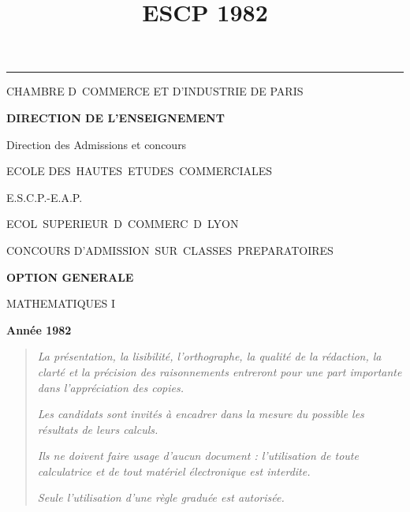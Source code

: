 \documentclass[11pt]{article}%
\title{\bf \vspace{-2cm} ESCP 1982} %
\author{} %
\date{} %
\begin{document}
\maketitle %
\vspace{-1.4cm}\hrule %
\thispagestyle{fancy}

\vspace*{.2cm}




\begin{center}
{\small CHAMBRE D\E\ COMMERCE ET D'INDUSTRIE DE PARIS}

\textbf{DIRECTION DE L'ENSEIGNEMENT}

Direction des Admissions et concours

\underline{\hspace*{3cm}}

{\Large ECOLE DES\ HAUTES\ ETUDES\ COMMERCIALES}

{\Large E.S.C.P.-E.A.P.}

{\Large ECOL\E\ SUPERIEUR\E\ D\E\ COMMERC\E\ D\E\ LYON}{\large }

CONCOURS D'ADMISSION\ SUR\ CLASSES\ PREPARATOIRES

\underline{\hspace*{3cm}}

\textbf{OPTION GENERALE}

{\Large MATHEMATIQUES I}

\textbf{Année 1982}

\underline{\hspace*{3cm}}
\end{center}

\begin{quotation}
\noindent \textsl{La présentation, la lisibilité, l'orthographe, la
qualité
de la rédaction, la clarté et la précision des raisonnements entreront
pour
une part importante dans l'appréciation des copies.}

\noindent \textsl{Les candidats sont invités à encadrer dans la mesure
du
possible les résultats de leurs calculs.}

\noindent \textsl{Ils ne doivent faire usage d'aucun document :
l'utilisation de toute calculatrice et de tout matériel électronique
est
interdite.}

\noindent \textsl{Seule l'utilisation d'une règle graduée est
autorisée.}

\noindent \textsl{\hrulefill }
\end{quotation}
\end{document}
